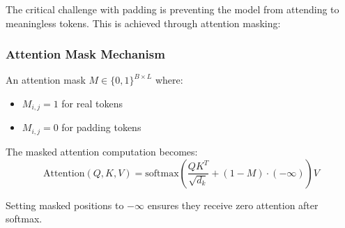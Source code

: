 The critical challenge with padding is preventing the model from attending to meaningless \pad{} tokens. This is achieved through attention masking:

\subsubsection{Attention Mask Mechanism}
An attention mask $M \in \{0, 1\}^{B \times L}$ where:
\begin{itemize}
\item $M_{i,j} = 1$ for real tokens
\item $M_{i,j} = 0$ for padding tokens
\end{itemize}

The masked attention computation becomes:
$$\text{Attention}(Q, K, V) = \text{softmax}\left(\frac{QK^T}{\sqrt{d_k}} + (1-M) \cdot (-\infty)\right)V$$

Setting masked positions to $-\infty$ ensures they receive zero attention after softmax.

